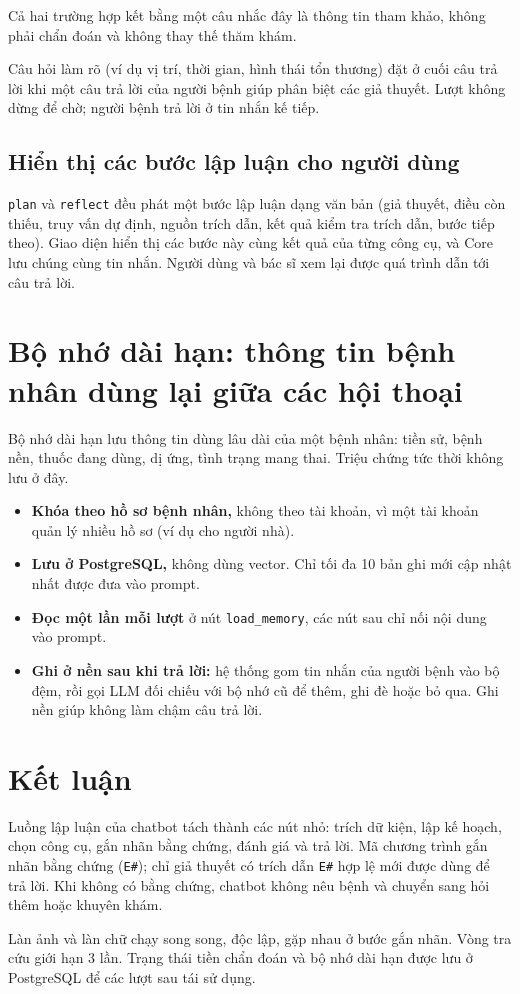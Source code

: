 Cả hai trường hợp kết bằng một câu nhắc đây là thông tin tham khảo, không phải chẩn đoán và không thay thế thăm khám.

Câu hỏi làm rõ (ví dụ vị trí, thời gian, hình thái tổn thương) đặt ở cuối câu trả lời khi một câu trả lời của người bệnh giúp phân biệt các giả thuyết. Lượt không dừng để chờ; người bệnh trả lời ở tin nhắn kế tiếp.

\subsection{Hiển thị các bước lập luận cho người dùng}

\texttt{plan} và \texttt{reflect} đều phát một bước lập luận dạng văn bản (giả thuyết, điều còn thiếu, truy vấn dự định, nguồn trích dẫn, kết quả kiểm tra trích dẫn, bước tiếp theo). Giao diện hiển thị các bước này cùng kết quả của từng công cụ, và Core lưu chúng cùng tin nhắn. Người dùng và bác sĩ xem lại được quá trình dẫn tới câu trả lời.

\section{Bộ nhớ dài hạn: thông tin bệnh nhân dùng lại giữa các hội thoại}
\label{sec:bo-nho}

Bộ nhớ dài hạn lưu thông tin dùng lâu dài của một bệnh nhân: tiền sử, bệnh nền, thuốc đang dùng, dị ứng, tình trạng mang thai. Triệu chứng tức thời không lưu ở đây.
\begin{itemize}
  \item \textbf{Khóa theo hồ sơ bệnh nhân,} không theo tài khoản, vì một tài khoản quản lý nhiều hồ sơ (ví dụ cho người nhà).
  \item \textbf{Lưu ở PostgreSQL,} không dùng vector. Chỉ tối đa 10 bản ghi mới cập nhật nhất được đưa vào prompt.
  \item \textbf{Đọc một lần mỗi lượt} ở nút \texttt{load\_memory}, các nút sau chỉ nối nội dung vào prompt.
  \item \textbf{Ghi ở nền sau khi trả lời:} hệ thống gom tin nhắn của người bệnh vào bộ đệm, rồi gọi LLM đối chiếu với bộ nhớ cũ để thêm, ghi đè hoặc bỏ qua. Ghi nền giúp không làm chậm câu trả lời.
\end{itemize}

\section{Kết luận}

Luồng lập luận của chatbot tách thành các nút nhỏ: trích dữ kiện, lập kế hoạch, chọn công cụ, gắn nhãn bằng chứng, đánh giá và trả lời. Mã chương trình gắn nhãn bằng chứng (\texttt{E\#}); chỉ giả thuyết có trích dẫn \texttt{E\#} hợp lệ mới được dùng để trả lời. Khi không có bằng chứng, chatbot không nêu bệnh và chuyển sang hỏi thêm hoặc khuyên khám.

Làn ảnh và làn chữ chạy song song, độc lập, gặp nhau ở bước gắn nhãn. Vòng tra cứu giới hạn 3 lần. Trạng thái tiền chẩn đoán và bộ nhớ dài hạn được lưu ở PostgreSQL để các lượt sau tái sử dụng.
